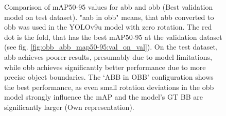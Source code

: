 
\begin{figure}[htbp]
    \centering
    
    \caption[Comparison of \acrshort{mAP}50-95 values for \acrshort{abb} and \acrshort{obb} (Best validation model on test dataset)]{Comparison of \acrshort{mAP}50-95 values for \acrshort{abb} and \acrshort{obb} (Best validation model on test dataset). "aab in obb" means, that \acrlong{abb} converted to obb was used in the \acrshort{YOLO}v9u model with zero rotation. The red dot is the fold, that has the best \acrshort{mAP}50-95 at the validation dataset (see fig. \ref{fig:obb_abb_map50-95:val_on_val}).  On the test dataset, \acrshort{abb} achieves poorer results, presumably due to model limitations, while \acrshort{obb} achieves significantly better performance due to more precise object boundaries. The ‘ABB in OBB’ configuration shows the best performance, as even small rotation deviations in the \acrshort{obb} model strongly influence the \acrshort{mAP} and the model's \acrshort{GT} \acrshort{BB} are significantly larger (Own representation). }
    \label{fig:obb_abb_map50-95:val_on_test}
\end{figure}



